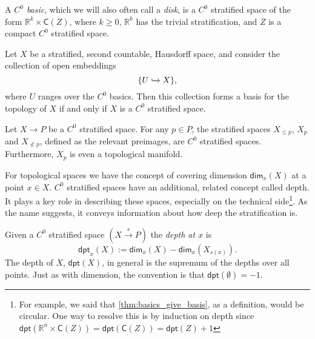 \documentclass[../text]{subfiles}
\begin{document}
\begin{definition}
    A \emph{$C^0$ basic}, which we will also often call a \emph{disk}, is a $C^0$ stratified space of the form $\mathbb{R}^k \times \mathsf{C}(Z)$, where $k \geq 0$, $\mathbb{R}^k$ has the trivial stratification, and $Z$ is a compact $C^0$ stratified space.
\end{definition}

\begin{theorem}\label{thm:basics_give_basis}
    Let $X$ be a stratified, second countable, Hausdorff space, and consider the collection of open embeddings
    \begin{equation}
        \{ U \xhookrightarrow{} X\},
    \end{equation}
    where $U$ ranges over the $C^0$ basics. Then this collection forms a basis for the topology of $X$ if and only if $X$ is a $C^0$ stratified space.
\end{theorem}

\begin{theorem}
    Let $X \rightarrow P$ be a $C^0$ stratified space. For any $p \in P$, the stratified spaces $X_{\leq p}$, $X_{p}$ and $X_{\nless p}$, defined as the relevant preimages, are $C^0$ stratified spaces. Furthermore, $X_p$ is even a topological manifold.
\end{theorem}

For topological spaces we have the concept of covering dimension $\mathsf{dim}_x (X)$ at a point $x \in X$. $C^0$ stratified spaces have an additional, related concept called depth. It plays a key role in describing these spaces, especially on the technical side\footnote{For example, we said that \cref{thm:basics_give_basis}, as a definition, would be circular. One way to resolve this is by induction on depth since $\mathsf{dpt} (\mathbb{R}^n \times \mathsf{C}(Z)) = \mathsf{dpt} (\mathsf{C}(Z)) = \mathsf{dpt} (Z) + 1$}. As the name suggests, it conveys information about how deep the stratification is.

\begin{definition}
    Given a $C^0$ stratified space $(X \xrightarrow{s} P)$ the \emph{depth at $x$} is
    \begin{equation}
        \mathsf{dpt}_x (X) := \mathsf{dim}_x (X) - \mathsf{dim}_x (X_{s(x)}).
    \end{equation}
    The depth of $X$, $\mathsf{dpt} (X)$, in general is the supremum of the depths over all points. Just as with dimension, the convention is that $\mathsf{dpt}(\emptyset) = -1$.
\end{definition}
\end{document}
